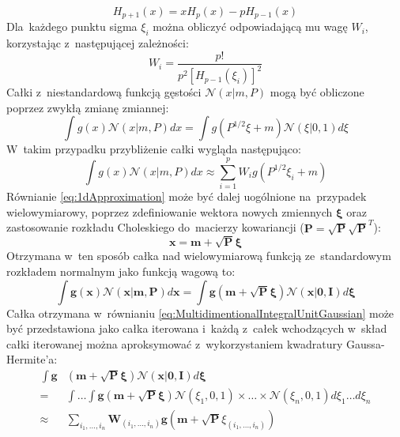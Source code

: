 \begin{equation}
	H_{p+1}(x)=xH_p(x)-pH_{p-1}(x)
\end{equation}
Dla~każdego punktu sigma $\xi_i$ można obliczyć odpowiadającą mu wagę $W_i$, korzystając z~następującej zależności:
\begin{equation}
W_i = \frac{p!}{p^2[H_{p-1}(\xi_i)]^2}
\end{equation}
Całki z~niestandardową funkcją gęstości $\mathcal{N}(x|m, P)$ mogą być obliczone poprzez zwykłą zmianę zmiannej:
\begin{equation}
\int g(x)\mathcal{N}(x|m,P)dx = \int g(P^{1/2}\xi + m)\mathcal{N}(\xi|0,1) d\xi
\end{equation}
W~takim przypadku przybliżenie całki wygląda następująco:
\begin{equation} \label{eq:1dApproximation}
\int g(x)\mathcal{N}(x|m,P)dx \approx \sum_{i=1}^{p} W_i g(P^{1/2}\xi_i + m)
\end{equation}
Równianie \ref{eq:1dApproximation} może być dalej uogólnione na~przypadek wielowymiarowy, poprzez zdefiniowanie wektora nowych zmiennych $\boldsymbol{\xi}$ oraz zastosowanie rozkładu Choleskiego do~macierzy kowariancji ($\boldsymbol{P}=\sqrt{\boldsymbol{P}}\sqrt{\boldsymbol{P}}^T$):
\begin{equation}
	\boldsymbol{x}=\boldsymbol{m}+\sqrt{\boldsymbol{P}}\boldsymbol{\xi}
\end{equation}
Otrzymana w~ten sposób całka nad wielowymiarową funkcją ze~standardowym rozkładem normalnym jako funkcją wagową to:
\begin{equation} \label{eq:MultidimentionalIntegralUnitGaussian}
\int \boldsymbol{g}(\boldsymbol{x})\mathcal{N}(\boldsymbol{x}|\boldsymbol{m},\boldsymbol{P})d\boldsymbol{x} = \int \boldsymbol{g}(\boldsymbol{m} + \sqrt{\boldsymbol{P}}\boldsymbol{\xi})\mathcal{N}(\boldsymbol{x}|\boldsymbol{0},\boldsymbol{I})d\boldsymbol{\xi}
\end{equation}
Całka otrzymana w~równianiu \ref{eq:MultidimentionalIntegralUnitGaussian} może być przedstawiona jako całka iterowana i~każdą z~całek wchodzących w~skład całki iterowanej można aproksymować z~wykorzystaniem kwadratury Gaussa-Hermite'a:
\begin{align}
\int \boldsymbol{g}&(\boldsymbol{m} + \sqrt{\boldsymbol{P}}\boldsymbol{\xi})\mathcal{N}(\boldsymbol{x}|\boldsymbol{0},\boldsymbol{I})d\boldsymbol{\xi} \nonumber \\ = &\int \dots \int \boldsymbol{g}(\boldsymbol{m} + \sqrt{\boldsymbol{P}}\boldsymbol{\xi})\mathcal{N}(\xi_1, 0, 1) \times \dots \times \mathcal{N}(\xi_n, 0, 1) d\xi_1 \dots d\xi_n \nonumber \\ \approx & \sum_{i_1,\dots,i_n}^{}\boldsymbol{W}_{(i_1, \dots, i_n)} \boldsymbol{g}(\boldsymbol{m} + \sqrt{\boldsymbol{P}}\xi_{(i_1, \dots, i_n)} )
\end{align}

